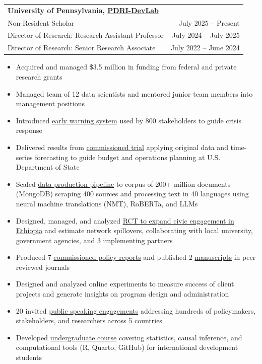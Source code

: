 \documentclass[11pt]{article}
\begin{document}
\noindent\begin{tabular*}{\textwidth}{@{}l@{\extracolsep{\fill}}r@{}}
\textbf{University of Pennsylvania, \href{https://web.sas.upenn.edu/dev-lab/}{PDRI-DevLab}}\\
Non-Resident Scholar & July 2025 -- Present\\
Director of Research: Research Assistant Professor & July 2024 -- July 2025\\
Director of Research: Senior Research Associate & July 2022 -- June 2024\\
\end{tabular*}
\begin{itemize}[itemsep=0mm, parsep=0pt]
  \item Acquired and managed \$3.5 million in funding from federal and private research grants
  \item Managed team of 12 data scientists and mentored junior team members into management positions 
  \item Introduced \href{https://web.sas.upenn.edu/mlp-devlab/civic-space-data-and-forecasts/}{early warning system} used by 800 stakeholders to guide crisis response
  \item Delivered results from \href{https://bpb-us-w2.wpmucdn.com/web.sas.upenn.edu/dist/4/872/files/2024/11/Forecasting-DOS-Travel-Advisories-with-Machine-Learning-for-Peace-Data-V2-internal.pdf}{commissioned trial} applying original data and time-series forecasting to guide budget and operations planning at U.S. Department of State
  \item Scaled \href{https://bpb-us-w2.wpmucdn.com/web.sas.upenn.edu/dist/4/872/files/2024/08/Presenting_MLP.pdf}{data production pipeline} to corpus of 200+ million documents (MongoDB) scraping 400 sources and processing text in 40 languages using neural machine translations (NMT), RoBERTa, and LLMs
  \item Designed, managed, and analyzed \href{https://jrspringman.github.io/files/ethiopia_ie.pdf}{RCT to expand civic engagement in Ethiopia} and estimate network spillovers, collaborating with local university, government agencies, and 3 implementing partners
  \item Produced 7 \href{https://jrspringman.github.io/research.html#select-commissioned-policy-reports}{commissioned policy reports} and published 2 \href{https://jrspringman.github.io/research.html#under-review}{manuscripts} in peer-reviewed journals
   \item Designed and analyzed online experiments to measure success of client projects and generate insights on program design and administration
   \item 20 invited \href{https://jrspringman.github.io/public.html#world-bank-engagefest-webinar}{public speaking engagements} addressing hundreds of policymakers, stakeholders, and researchers across 5 countries
  \item Developed \href{https://jrspringman.github.io/psci3200-globaldev/}{undergraduate course} covering statistics, causal inference, and computational tools (R, Quarto, GitHub) for international development students
\end{itemize}
\end{document}
